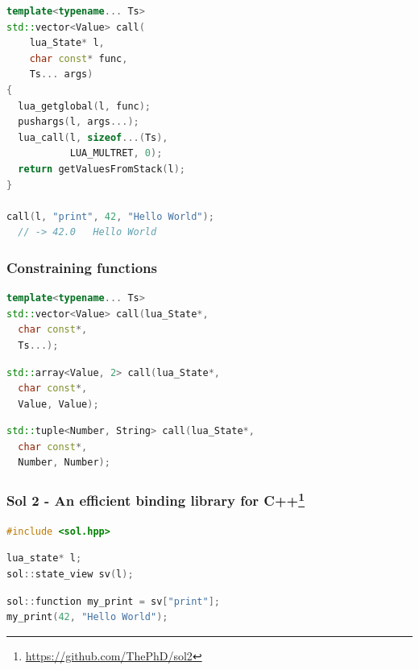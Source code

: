\documentclass{beamer}
\newif\iftransitions
\begin{document}
\begin{frame}[fragile]
\begin{semiverbatim}
LUA_MULTRET, 0);}}
\uncover<5->{\alert<5>{  {\color{blue}return} getValuesFromStack(l);  }}
\uncover<1->{\alert<0>{\}}}

\uncover<6->{\alert<6>{call(l, "print", 42, "Hello World");}}
\uncover<6->{\alert<6>{  // -> 42.0   Hello World}}
  \end{semiverbatim}
  \else
  \begin{lstlisting}[language={C++}]
template<typename... Ts>
std::vector<Value> call(
    lua_State* l,
    char const* func,
    Ts... args)
{
  lua_getglobal(l, func);
  pushargs(l, args...);
  lua_call(l, sizeof...(Ts),
           LUA_MULTRET, 0);
  return getValuesFromStack(l);  
}

call(l, "print", 42, "Hello World");
  // -> 42.0   Hello World
  \end{lstlisting}
  \fi
\end{frame}


\begin{frame}[fragile]
  \frametitle{Constraining functions}

  \begin{lstlisting}[language={C++}]
template<typename... Ts>
std::vector<Value> call(lua_State*,
  char const*,
  Ts...);
  \end{lstlisting}
  \iftransitions \pause \fi
  \begin{lstlisting}[language={C++}]
std::array<Value, 2> call(lua_State*,
  char const*,
  Value, Value);
  \end{lstlisting}
  \iftransitions \pause \fi
  \begin{lstlisting}[language={C++}]
std::tuple<Number, String> call(lua_State*,
  char const*,
  Number, Number);
  \end{lstlisting}

\end{frame}


\begin{frame}[fragile]
  \frametitle{Sol 2 - An efficient binding library for C++\footnote{\href{https://github.com/ThePhD/sol2}{https://github.com/ThePhD/sol2}}}
  
  
  \begin{lstlisting}[language={C++}]
#include <sol.hpp>
  \end{lstlisting}
  \iftransitions \pause \fi
  \begin{lstlisting}[language={C++}]
lua_state* l;
sol::state_view sv(l);
  \end{lstlisting}
  \iftransitions \pause \fi
  \begin{lstlisting}[language={C++}]
sol::function my_print = sv["print"];
my_print(42, "Hello World");
  \end{lstlisting}
\end{frame}
\end{document}
